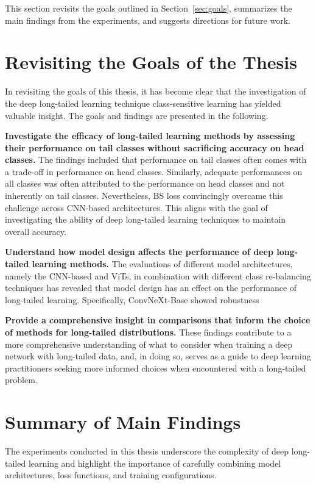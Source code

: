 This section revisits the goals outlined in Section~\ref{sec:goals}, summarizes the main findings from the experiments, and suggests directions for future work.

\section{Revisiting the Goals of the Thesis}
In revisiting the goals of this thesis, it has become clear that the investigation of the deep long-tailed learning technique class-sensitive learning has yielded valuable insight. The goals and findings are presented in the following.

\noindent\textbf{Investigate the efficacy of long-tailed learning methods by assessing their performance on tail classes without sacrificing accuracy on head classes.}
The findings included that performance on tail classes often comes with a trade-off in performance on head classes. Similarly, adequate performances on all classes was often attributed to the performance on head classes and not inherently on tail classes. Nevertheless, BS loss convincingly overcame this challenge across CNN-based architectures. This aligns with the goal of investigating the ability of deep long-tailed learning techniques to maintain overall accuracy. 

\noindent \textbf{Understand how model design affects the performance of deep long-tailed learning methods.}
The evaluations of different model architectures, namely the CNN-based and ViTs, in combination with different class re-balancing techniques has revealed that model design has an effect on the performance of long-tailed learning. Specifically, ConvNeXt-Base showed robustness  

\noindent \textbf{Provide a comprehensive insight in comparisons that inform the choice of methods for long-tailed distributions.}
These findings contribute to a more comprehensive understanding of what to consider when training a deep network with long-tailed data, and, in doing so, serves as a guide to deep learning practitioners seeking more informed choices when encountered with a long-tailed problem.

\section{Summary of Main Findings}
The experiments conducted in this thesis underscore the complexity of deep long-tailed learning and highlight the importance of carefully combining model architectures, loss functions, and training configurations. 


